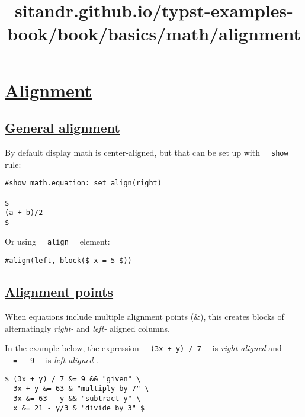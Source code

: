 \title{sitandr.github.io/typst-examples-book/book/basics/math/alignment}

\section{\texorpdfstring{\hyperref[alignment]{Alignment}}{Alignment}}\label{alignment}

\subsection{\texorpdfstring{\hyperref[general-alignment]{General
alignment}}{General alignment}}\label{general-alignment}

By default display math is center-aligned, but that can be set up with
\texttt{\ }{\texttt{\ show\ }}\texttt{\ } rule:

\begin{verbatim}
#show math.equation: set align(right)

$
(a + b)/2
$
\end{verbatim}

\pandocbounded{}

Or using \texttt{\ }{\texttt{\ align\ }}\texttt{\ } element:

\begin{verbatim}
#align(left, block($ x = 5 $))
\end{verbatim}

\pandocbounded{}

\subsection{\texorpdfstring{\hyperref[alignment-points]{Alignment
points}}{Alignment points}}\label{alignment-points}

When equations include multiple alignment points (\&), this creates
blocks of alternatingly \emph{right-} and \emph{left-} aligned columns.

In the example below, the expression
\texttt{\ }{\texttt{\ (3x\ +\ y)\ /\ 7\ }}\texttt{\ } is
\emph{right-aligned} and
\texttt{\ }{\texttt{\ =\ }}\texttt{\ }{\texttt{\ 9\ }}\texttt{\ } is
\emph{left-aligned} .

\begin{verbatim}
$ (3x + y) / 7 &= 9 && "given" \
  3x + y &= 63 & "multiply by 7" \
  3x &= 63 - y && "subtract y" \
  x &= 21 - y/3 & "divide by 3" $
\end{verbatim}

